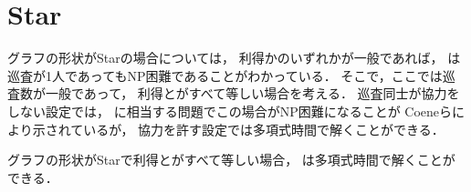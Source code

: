 \section{Star}
グラフの形状がStarの場合については，
利得か{\timelimit}のいずれかが一般であれば，
{\patrolling}は巡査が1人であってもNP困難であることがわかっている\cite{coene2011charlemagne}．
そこで，ここでは巡査数が一般であって，
利得と{\timelimit}がすべて等しい場合を考える．
巡査同士が協力をしない設定では，
{\decisionpp}に相当する問題でこの場合がNP困難になることが
Coeneら\cite{coene2011charlemagne}により示されているが，
協力を許す設定では多項式時間で解くことができる．

\begin{theo}
    \label{theo:StarEqualProfitTimelimit}
    グラフの形状がStarで利得と{\timelimit}がすべて等しい場合，
    {\patrolling}は多項式時間で解くことができる．
\end{theo}


